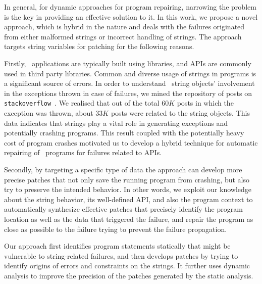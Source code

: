 In general, for dynamic approaches for program repairing, narrowing the problem
is the key in providing an effective solution to it. In this work, we propose a
novel
approach, which is hybrid in the nature and
deals with the failures originated from either malformed strings or incorrect
handling of strings. The approach targets string variables for patching for the
following reasons.

Firstly, \java\ applications are typically built using libraries, and
 APIs
are commonly used in third party libraries. Common and diverse usage of strings
in programs is a significant source of errors. In order to understand \java\
string objects'
involvement in the exceptions thrown in case of failures, we mined the
repository of posts
on \texttt{stackoverflow}~\cite{stackoverflow}. We realised that out
of the total $60K$ posts in which the exception was thrown, about $33K$ posts
were
related to the \java string objects. This data indicates that strings play a
vital
role in generating exceptions and potentially crashing programs. This result
coupled with the potentially
heavy cost of program crashes motivated us to develop a hybrid technique for
automatic repairing of \java\ programs for failures related to \code{String}
APIs.


Secondly, by targeting a specific type of data
the approach can develop more precise patches that not only save the running
program from crashing, but 
also try to preserve the intended behavior. In other words, we exploit our
knowledge about the string behavior, its well-defined API, and also the program
context to automatically synthesize 
effective patches that precisely identify the program location as well as the
data that triggered the failure, and 
repair the program as close as possible to the failure trying to prevent the
failure propagation.

Our approach first identifies program statements statically
that might be vulnerable to string-related failures, and then develops patches
by trying to identify origins of errors and constraints on the strings. It
further uses dynamic
analysis to improve the precision of the patches generated by the static
analysis. 


